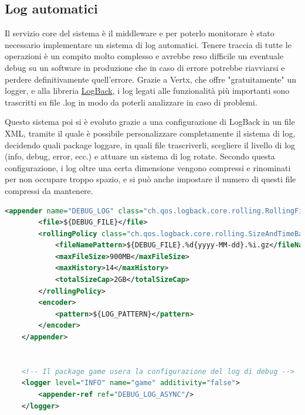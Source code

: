 \subsection{Log automatici}

Il servizio core del sistema è il middleware e per poterlo monitorare è stato necessario implementare un sistema di log automatici. Tenere traccia di tutte le operazioni è un compito molto complesso e avrebbe reso difficile un eventuale debug su un software in produzione che in caso di errore potrebbe riavviarsi e perdere definitivamente quell'errore.
Grazie a Vertx, che offre "gratuitamente" un logger, e alla libreria \href{https://mvnrepository.com/artifact/ch.qos.logback/logback-classic}{\underline{LogBack}}, i log legati alle funzionalità più importanti sono trascritti su file .log in modo da poterli analizzare in caso di problemi.

Questo sistema poi si è evoluto grazie a una configurazione di LogBack in un file XML, tramite il quale è possibile personalizzare completamente il sistema di log, decidendo quali package loggare, in quali file trascriverli, scegliere il livello di log (info, debug, error, ecc.) e attuare un sistema di log rotate. Secondo questa configurazione, i log oltre una certa dimensione vengono compressi e rinominati per non occupare troppo spazio, e si può anche impostare il numero di questi file compressi da mantenere.

\begin{lstlisting}[language=Xml, caption={File configurazione Log automatici}, label=list:xml_logback]
    <appender name="DEBUG_LOG" class="ch.qos.logback.core.rolling.RollingFileAppender">
        <file>${DEBUG_FILE}</file>
        <rollingPolicy class="ch.qos.logback.core.rolling.SizeAndTimeBasedRollingPolicy">
            <fileNamePattern>${DEBUG_FILE}.%d{yyyy-MM-dd}.%i.gz</fileNamePattern>
            <maxFileSize>900MB</maxFileSize>
            <maxHistory>14</maxHistory>
            <totalSizeCap>2GB</totalSizeCap>
        </rollingPolicy>
        <encoder>
            <pattern>${LOG_PATTERN}</pattern>
        </encoder>
    </appender>


    <!-- Il package game usera la configurazione del log di debug -->
    <logger level="INFO" name="game" additivity="false">
        <appender-ref ref="DEBUG_LOG_ASYNC"/>
    </logger>

\end{lstlisting}

\vspace{1cm}

